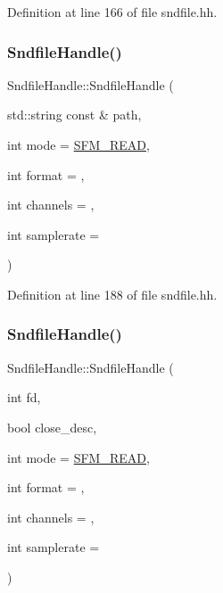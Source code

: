 Definition at line 166 of file sndfile.\+hh.

\mbox{\label{class_sndfile_handle_af782c1d529a09587c127272bd96cb42a}} 
\subsubsection{\texorpdfstring{SndfileHandle()}{SndfileHandle()}\hspace{0.1cm}{\footnotesize\ttfamily [3/6]}}
{\footnotesize\ttfamily Sndfile\+Handle\+::\+Sndfile\+Handle (\begin{DoxyParamCaption}\item[{std\+::string const \&}]{path,  }\item[{int}]{mode = {\ttfamily \mbox{\hyperlink{sndfile_8h_adc29c2ff13d900c2f185ee95427fb06ca125531fe9c895237bccd35736370e815}{S\+F\+M\+\_\+\+R\+E\+AD}}},  }\item[{int}]{format = {},  }\item[{int}]{channels = {},  }\item[{int}]{samplerate = {} }\end{DoxyParamCaption})\hspace{0.3cm}{\ttfamily [inline]}}



Definition at line 188 of file sndfile.\+hh.

\mbox{\label{class_sndfile_handle_a3cbcef78befb00c3ad7391754a9c0343}} 
\subsubsection{\texorpdfstring{SndfileHandle()}{SndfileHandle()}\hspace{0.1cm}{\footnotesize\ttfamily [4/6]}}
{\footnotesize\ttfamily Sndfile\+Handle\+::\+Sndfile\+Handle (\begin{DoxyParamCaption}\item[{int}]{fd,  }\item[{bool}]{close\+\_\+desc,  }\item[{int}]{mode = {\ttfamily \mbox{\hyperlink{sndfile_8h_adc29c2ff13d900c2f185ee95427fb06ca125531fe9c895237bccd35736370e815}{S\+F\+M\+\_\+\+R\+E\+AD}}},  }\item[{int}]{format = {},  }\item[{int}]{channels = {},  }\item[{int}]{samplerate = {} }\end{DoxyParamCaption})\hspace{0.3cm}{\ttfamily [inline]}}



